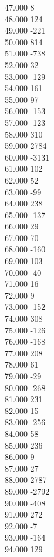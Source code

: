{ 47.000	8 \\
 48.000	124 \\
 49.000	-221 \\
 50.000	814 \\
 51.000	-738 \\
 52.000	32 \\
 53.000	-129 \\
 54.000	161 \\
 55.000	97 \\
 56.000	-153 \\
 57.000	-123 \\
 58.000	310 \\
 59.000	2784 \\
 60.000	-3131 \\
 61.000	102 \\
 62.000	52 \\
 63.000	-99 \\
 64.000	238 \\
 65.000	-137 \\
 66.000	29 \\
 67.000	70 \\
 68.000	-160 \\
 69.000	103 \\
 70.000	-40 \\
 71.000	16 \\
 72.000	9 \\
 73.000	-152 \\
 74.000	308 \\
 75.000	-126 \\
 76.000	-168 \\
 77.000	208 \\
 78.000	61 \\
 79.000	-29 \\
 80.000	-268 \\
 81.000	231 \\
 82.000	15 \\
 83.000	-256 \\
 84.000	58 \\
 85.000	236 \\
 86.000	9 \\
 87.000	27 \\
 88.000	2787 \\
 89.000	-2792 \\
 90.000	-408 \\
 91.000	272 \\
 92.000	-7 \\
 93.000	-164 \\
 94.000	129 \\
}
